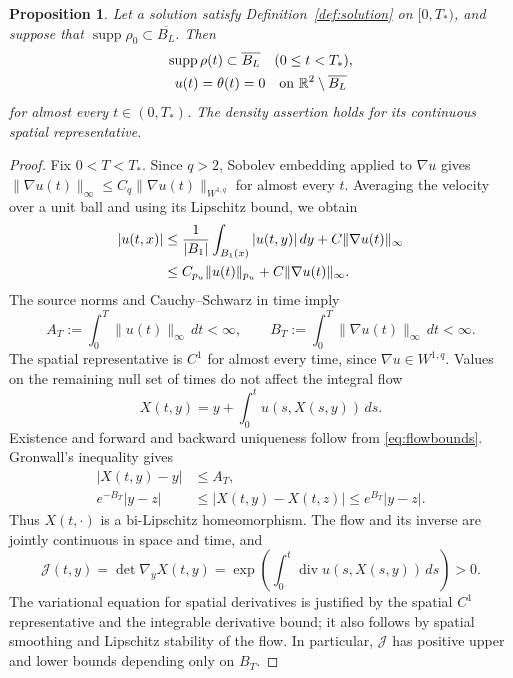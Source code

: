 \documentclass[11pt,letterpaper]{article}
\numberwithin{equation}{section}
\newtheorem{proposition}[theorem]{Proposition}
\theoremstyle{definition}
\newcommand{\R}{\mathbb R}
\newcommand{\dt}{\,dt}
\newcommand{\Div}{\operatorname{div}}
\newcommand{\supp}{\operatorname{supp}}
\newcommand{\norm}[2]{\lVert#1\rVert_{#2}}
\begin{document}
\begin{proposition}\label{prop:fixedsupport}
Let a solution satisfy Definition~\ref{def:solution} on $[0,T_*)$,
and suppose that $\supp\rho_0\subset\overline{B_L}$. Then
\begin{equation}
 \begin{gathered}
 \supp\rho(t)\subset\overline{B_L}\quad(0\le t<T_*),\\
 u(t)=\theta(t)=0\quad\hbox{on }\R^2\setminus\overline{B_L}
 \end{gathered}
 \label{eq:fixedsupport}
\end{equation}
for almost every $t\in(0,T_*)$. The density assertion holds for its
continuous spatial representative.
\end{proposition}

\begin{proof}
Fix $0<T<T_*$. Since $q>2$, Sobolev embedding applied to $\nabla u$
gives
$\norm{\nabla u(t)}{\infty}
\le C_q\norm{\nabla u(t)}{W^{1,q}}$
for almost every $t$. Averaging the velocity over a unit ball and
using its Lipschitz bound, we obtain
\begin{align}
 |u(t,x)|
 &\le \frac1{|B_1|}\int_{B_1(x)}|u(t,y)|\,dy
           +C\norm{\nabla u(t)}{\infty}\notag\\
 &\le C_{p_u}\norm{u(t)}{p_u}
           +C\norm{\nabla u(t)}{\infty}.
 \label{eq:velocitybound}
\end{align}
The source norms and Cauchy--Schwarz in time imply
\begin{equation}
 A_T:=\int_0^T\norm{u(t)}{\infty}\dt<\infty,\qquad
 B_T:=\int_0^T\norm{\nabla u(t)}{\infty}\dt<\infty.
 \label{eq:flowbounds}
\end{equation}
The spatial representative is $C^1$ for almost every time, since
$\nabla u\in W^{1,q}$. Values on the remaining null set of times
do not affect the integral flow
\begin{equation}
 X(t,y)=y+\int_0^t u(s,X(s,y))\,ds.
 \label{eq:flow}
\end{equation}
Existence and forward and backward uniqueness follow from
\eqref{eq:flowbounds}. Gronwall's inequality gives
\begin{equation}
 \begin{aligned}
 |X(t,y)-y|&\le A_T,\\
 e^{-B_T}|y-z|&\le |X(t,y)-X(t,z)|
                        \le e^{B_T}|y-z|.
 \end{aligned}\label{eq:bilipschitz}
\end{equation}
Thus $X(t,\cdot)$ is a bi-Lipschitz homeomorphism. The flow and its
inverse are jointly continuous in space and time, and
\begin{equation}
 \mathcal J(t,y)=\det\nabla_yX(t,y)
    =\exp\left(\int_0^t\Div u(s,X(s,y))\,ds\right)>0.
 \label{eq:jacobian}
\end{equation}
The variational equation for spatial derivatives is justified by
the spatial $C^1$ representative and the integrable derivative bound;
it also follows by spatial smoothing and Lipschitz stability of the
flow. In particular, $\mathcal J$ has positive upper and lower bounds
depending only on $B_T$.


\end{proof}
\end{document}
